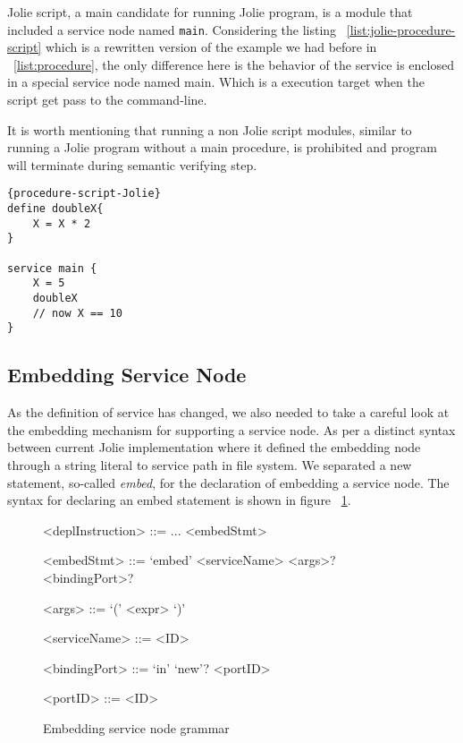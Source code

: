Jolie script, a main candidate for running Jolie program, is a module that included a service node named \texttt{main}. Considering the listing ~\ref{list:jolie-procedure-script} which is a rewritten version of the example we had before in ~\ref{list:procedure}, the only difference here is the behavior of the service is enclosed in a special service node named main. Which is a execution target when the script get pass to the command-line.

It is worth mentioning that running a non Jolie script modules, similar to running a Jolie program without a main procedure, is prohibited and program will terminate during semantic verifying step.

\begin{listing}[h]
    \lstset{language=Jolie,
        style=codeStyle
    }
    \begin{lstlisting}[frame=tlrb, caption= {A Jolie script version of ~\ref{list:procedure}}, label={list:jolie-procedure-script}]{procedure-script-Jolie}
define doubleX{
    X = X * 2
}

service main {
    X = 5
    doubleX
    // now X == 10
}
\end{lstlisting}
\end{listing}

\subsection{Embedding Service Node}

As the definition of service has changed, we also needed to take a careful look at the embedding mechanism for supporting a service node.
As per a distinct syntax between current Jolie implementation where it defined the embedding node through a string literal to service path in file system.
We separated a new statement, so-called \textit{embed}, for the declaration of embedding a service node.
The syntax for declaring an embed statement is shown in figure ~\ref{fig:jolie-servicenode-embed-grammar}.


\begin{figure}[h]
    \begin{framed}
        \begin{grammar}
            <deplInstruction> ::= ...
            \alt <embedStmt>

            <embedStmt> ::= `embed' <serviceName> <args>? <bindingPort>?

            <args> ::= `(' <expr> `)'

            <serviceName> ::= <ID>

            <bindingPort> ::= `in' `new'? <portID>

            <portID> ::= <ID>

        \end{grammar}
    \end{framed}
    \caption{Embedding service node grammar}
    \label{fig:jolie-servicenode-embed-grammar}
\end{figure}

